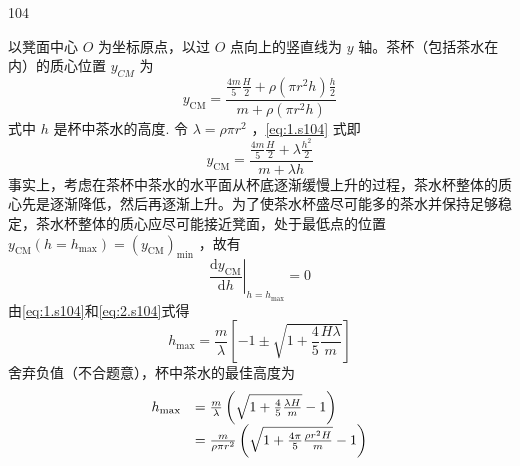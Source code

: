\begin{solution}{104}
\begin{subsolution}
以凳面中心 $O$ 为坐标原点，以过 $O$ 点向上的竖直线为 $y$ 轴。茶杯（包括茶水在内）的质心位置 $y_{CM}$ 为
\begin{equation}
y_{\mathrm{CM}} = \frac{\frac{4m}{5}\frac{H}{2} + \rho(\pi r^{2} h)\frac{h}{2}}{m + \rho(\pi r^{2} h)}
\label{eq:1.s104}
\end{equation}
式中 $h$ 是杯中茶水的高度. 令 $\lambda = \rho \pi r^{2}$ ，\eqref{eq:1.s104} 式即
\[
y_{\mathrm{CM}} = \frac{\frac{4m}{5}\frac{H}{2} + \lambda \frac{h^{2}}{2}}{m + \lambda h}
\]
事实上，考虑在茶杯中茶水的水平面从杯底逐渐缓慢上升的过程，茶水杯整体的质心先是逐渐降低，然后再逐渐上升。为了使茶水杯盛尽可能多的茶水并保持足够稳定，茶水杯整体的质心应尽可能接近凳面，处于最低点的位置 $y_{\mathrm{CM}}(h = h_{\max}) = (y_{\mathrm{CM}})_{\min}$ ，故有
\begin{equation}
\left.\frac{\mathrm{d} y_{\mathrm{CM}}}{\mathrm{d} h}\right|_{h = h_{\max}} = 0
\label{eq:2.s104}
\end{equation}
由\eqref{eq:1.s104}和\eqref{eq:2.s104}式得
\begin{equation}
h_{\max} = \frac{m}{\lambda}\left[-1 \pm \sqrt{1 + \frac{4}{5}\frac{H\lambda}{m}}\right]
\label{eq:3.s104}
\end{equation}
舍弃负值（不合题意），杯中茶水的最佳高度为
\begin{equation}
\begin{array}{r l}
h_{\max} & = \frac{m}{\lambda}\left(\sqrt{1 + \frac{4}{5}\frac{\lambda H}{m}} - 1\right) \\
& = \frac{m}{\rho\pi r^{2}}\left(\sqrt{1 + \frac{4\pi}{5}\frac{\rho r^{2} H}{m}} - 1\right)
\end{array}
\label{eq:4.s104}
\end{equation}


\end{subsolution}
\end{solution}
